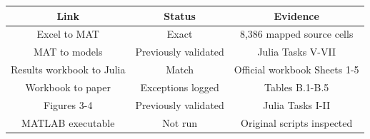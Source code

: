 \begin{table}[!ht]
\setlength\tabcolsep{0.425em}
\setlength\aboverulesep{0pt}
\setlength\belowrulesep{0.2em}
\centering
\begin{threeparttable}
\begin{tabular}{ccc}
\toprule[0.1em]
Link & Status & Evidence \\[0.2em]
\midrule[0.075em]
Excel to MAT & Exact & 8,386 mapped source cells \\[0.2em]
MAT to models & Previously validated & Julia Tasks V-VII \\[0.2em]
Results workbook to Julia & Match & Official workbook Sheets 1-5 \\[0.2em]
Workbook to paper & Exceptions logged & Tables B.1-B.5 \\[0.2em]
Figures 3-4 & Previously validated & Julia Tasks I-II \\[0.2em]
MATLAB executable & Not run & Original scripts inspected \\[0.2em]
\bottomrule[0.1em]
\end{tabular}
\end{threeparttable}
\end{table}


